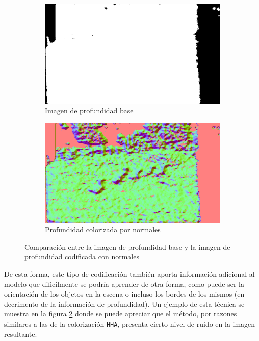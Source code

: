 \documentclass[12pt,a4paper]{report}
\begin{document}
\begin{figure}[!h]
    \centering
    \begin{subfigure}{0.45\textwidth}
        \centering
        \includegraphics[width=\textwidth]{media/data/depth_gueese.png}
        \caption{Imagen de profundidad base}
        \label{fig:depth-base-distance}
    \end{subfigure}
    \hfill
    \begin{subfigure}{0.45\textwidth}
        \centering
        \includegraphics[width=\textwidth]{media/data/normal_gueese.png}
        \caption{Profundidad colorizada por normales}
        \label{fig:normals-colorization}
    \end{subfigure}
    \caption{Comparación entre la imagen de profundidad base y la imagen de profundidad codificada con normales}
    \label{fig:normals-comparison}
\end{figure}

De esta forma, este tipo de codificación también aporta información adicional al modelo que dificilmente se podría aprender de otra forma, como puede ser la orientación de los objetos en la escena o incluso los bordes de los mismos (en decrimento de la información de profundidad). Un ejemplo de esta técnica se muestra en la figura \ref{fig:normals-colorization} donde se puede apreciar que el método, por razones similares a las de la colorización \texttt{HHA}, presenta cierto nivel de ruido en la imagen resultante.
\end{document}
